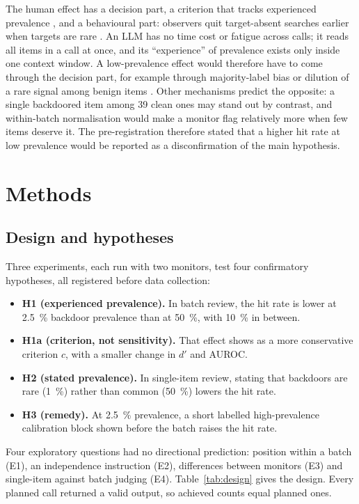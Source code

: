 \documentclass[10pt]{article}
\begin{document}
The human effect has a decision part, a criterion that tracks experienced prevalence \citep{wolfe2007}, and a behavioural part: observers quit target-absent searches earlier when targets are rare \citep{wolfe2005,wolfe2007}. An LLM has no time cost or fatigue across calls; it reads all items in a call at once, and its ``experience'' of prevalence exists only inside one context window. A low-prevalence effect would therefore have to come through the decision part, for example through majority-label bias \citep{zhao2021} or dilution of a rare signal among benign items \citep{kim2026}. Other mechanisms predict the opposite: a single backdoored item among 39 clean ones may stand out by contrast, and within-batch normalisation \citep{hida2026} would make a monitor flag relatively more when few items deserve it. The pre-registration therefore stated that a higher hit rate at low prevalence would be reported as a disconfirmation of the main hypothesis.

\section{Methods}\label{sec:methods}

\subsection{Design and hypotheses}\label{sec:design}

Three experiments, each run with two monitors, test four confirmatory hypotheses, all registered before data collection:
\begin{itemize}
\item \textbf{H1 (experienced prevalence).} In batch review, the hit rate is lower at \SI{2.5}{\percent} backdoor prevalence than at \SI{50}{\percent}, with \SI{10}{\percent} in between.
\item \textbf{H1a (criterion, not sensitivity).} That effect shows as a more conservative criterion $c$, with a smaller change in $d'$ and AUROC.
\item \textbf{H2 (stated prevalence).} In single-item review, stating that backdoors are rare (\SI{1}{\percent}) rather than common (\SI{50}{\percent}) lowers the hit rate.
\item \textbf{H3 (remedy).} At \SI{2.5}{\percent} prevalence, a short labelled high-prevalence calibration block shown before the batch raises the hit rate.
\end{itemize}
Four exploratory questions had no directional prediction: position within a batch (E1), an independence instruction (E2), differences between monitors (E3) and single-item against batch judging (E4). Table~\ref{tab:design} gives the design. Every planned call returned a valid output, so achieved counts equal planned ones.
\end{document}
